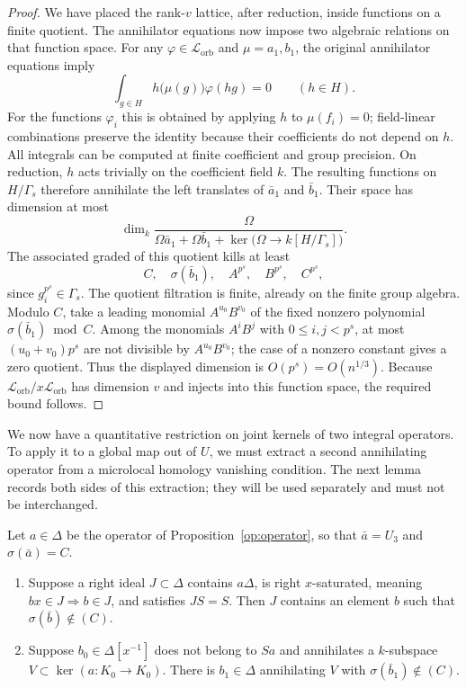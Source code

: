 \begin{proof}
We have placed the rank-$v$ lattice, after reduction, inside
functions on a finite quotient.  The annihilator equations now
impose two algebraic relations on that function space.
For any $\varphi\in\mathcal L_{\mathrm{orb}}$ and $\mu=a_1,b_1$, the original
annihilator equations imply
\begin{equation}
\label{obs:orbit-equations}
 \int_{g\in H}h\bigl(\mu(g)\bigr)\varphi(hg)=0
 \qquad(h\in H).
\end{equation}
For the functions $\varphi_i$ this is obtained by applying $h$ to
$\mu(f_i)=0$; field-linear combinations preserve the identity
because their coefficients do not depend on $h$.
All integrals can be computed at finite coefficient and group
precision.  On reduction, $h$ acts trivially on the coefficient
field $k$.  The resulting functions on $H/\Gamma_s$ therefore
annihilate the left translates of $\bar a_1$ and $\bar b_1$.
Their space has dimension at most
\[
 \dim_k\frac{\Omega}
 {\Omega\bar a_1+\Omega\bar b_1+
        \ker\bigl(\Omega\longrightarrow k[H/\Gamma_s]\bigr)}.
\]
The associated graded of this quotient kills at least
\[
 C,\quad \sigma(\bar b_1),\quad
 A^{p^s},\quad B^{p^s},\quad C^{p^s},
\]
since $g_i^{p^s}\in\Gamma_s$.  The quotient filtration is finite,
already on the finite group algebra.  Modulo $C$, take a leading
monomial $A^{u_0}B^{v_0}$ of the fixed nonzero polynomial
$\sigma(\bar b_1)\bmod C$.  Among the monomials
$A^iB^j$ with $0\leq i,j<p^s$, at most $(u_0+v_0)p^s$ are not
divisible by $A^{u_0}B^{v_0}$; the case of a nonzero constant gives a zero
quotient.  Thus the displayed dimension is $O(p^s)=O(n^{1/3})$.
Because $\mathcal L_{\mathrm{orb}}/x\mathcal L_{\mathrm{orb}}$ has dimension $v$ and injects
into this function space, the required bound follows.
\end{proof}

We now have a quantitative restriction on joint kernels of two
integral operators.  To apply it to a global map out of $U$, we must
extract a second annihilating operator from a microlocal homology
vanishing condition.  The next lemma records both sides of this
extraction; they will be used separately and must not be interchanged.

\begin{lemma}
\label{obs:right-annihilator}
Let $a\in\Delta$ be the operator of
Proposition~\ref{op:operator}, so that $\bar a=U_3$ and
$\sigma(\bar a)=C$.
\begin{enumerate}
 \item Suppose a right ideal $J\subset\Delta$ contains $a\Delta$,
 is right $x$-saturated, meaning $bx\in J\Rightarrow b\in J$,
 and satisfies $JS=S$.  Then $J$ contains an element $b$ such that
 $\sigma(\bar b)\notin(C)$.
 \item\label{obs:left-reduction}
 Suppose $b_0\in\Delta[x^{-1}]$ does not belong to $Sa$ and
 annihilates a $k$-subspace $V\subset\ker(a:K_0\to K_0)$.
 There is $b_1\in\Delta$ annihilating $V$ with
 $\sigma(\bar b_1)\notin(C)$.
\end{enumerate}
\end{lemma}

